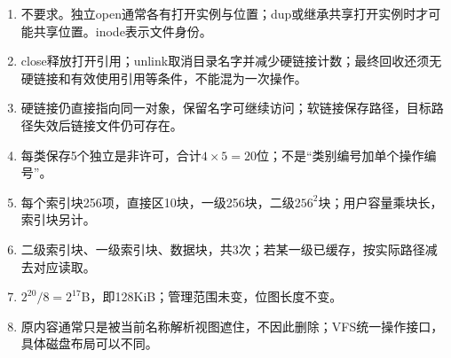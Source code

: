 {\begin{recallcard}[文件层次与容量核对]

\begin{enumerate}
\def\labelenumi{\arabic{enumi}.}
\tightlist
\item
  不要求。独立open通常各有打开实例与位置；dup或继承共享打开实例时才可能共享位置。inode表示文件身份。
\item
  close释放打开引用；unlink取消目录名字并减少硬链接计数；最终回收还须无硬链接和有效使用引用等条件，不能混为一次操作。
\item
  硬链接仍直接指向同一对象，保留名字可继续访问；软链接保存路径，目标路径失效后链接文件仍可存在。
\item
  每类保存5个独立是非许可，合计\(4\times5=20\)位；不是``类别编号加单个操作编号''。
\item
  每个索引块256项，直接区10块，一级256块，二级\(256^2\)块；用户容量乘块长，索引块另计。
\item
  二级索引块、一级索引块、数据块，共3次；若某一级已缓存，按实际路径减去对应读取。
\item
  \(2^{20}/8=2^{17}\)B，即128KiB；管理范围未变，位图长度不变。
\item
  原内容通常只是被当前名称解析视图遮住，不因此删除；VFS统一操作接口，具体磁盘布局可以不同。
\end{enumerate}

\end{recallcard}}
